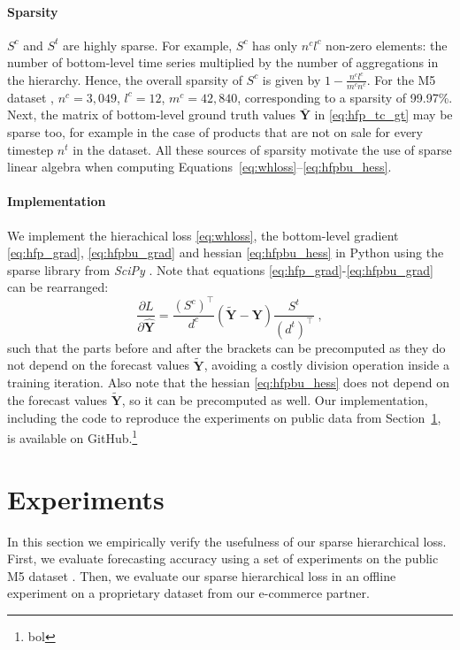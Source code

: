 \documentclass[preprint, 3p, times, twocolumn]{elsarticle}
\begin{document}
\paragraph{Sparsity} \(S^c\) and \(S^t\) are highly sparse. For example, \(S^c\) has only \(n^cl^c\) non-zero elements: the number of bottom-level time series multiplied by the number of aggregations in the hierarchy. Hence, the overall sparsity of \(S^c\) is given by \( 1 - \frac{n^cl^c}{m^cn^c} \). For the M5 dataset \cite{makridakis_m5_2021}, \(n^c = 3,049\), \(l^c = 12\), \(m^c=42,840\), corresponding to a sparsity of 99.97\%. Next, the matrix of bottom-level ground truth values \(\bar{\textbf{Y}}\) in \eqref{eq:hfp_tc_gt} may be sparse too, for example in the case of products that are not on sale for every timestep \(n^t\) in the dataset. All these sources of sparsity motivate the use of sparse linear algebra when computing Equations~\eqref{eq:whloss}--\eqref{eq:hfpbu_hess}. 

\paragraph{Implementation} We implement the hierachical loss \eqref{eq:whloss}, the bottom-level gradient \eqref{eq:hfp_grad}, \eqref{eq:hfpbu_grad} and hessian \eqref{eq:hfpbu_hess} in Python using the sparse library from \textit{SciPy} \cite{virtanen_scipy_2020}. Note that equations \eqref{eq:hfp_grad}-\eqref{eq:hfpbu_grad} can be rearranged:
\begin{equation} 
  \frac{\partial L}{\partial \hat{\textbf{Y}}} = \frac{(S^c)^\intercal}{d^c} \left( \tilde{\textbf{Y}} - \textbf{Y} \right) \frac{S^t}{(d^t)^\intercal} \;,
\end{equation}
such that the parts before and after the brackets can be precomputed as they do not depend on the forecast values \(\tilde{\textbf{Y}}\), avoiding a costly division operation inside a training iteration. Also note that the hessian \eqref{eq:hfpbu_hess} does not depend on the forecast values \(\tilde{\textbf{Y}}\), so it can be precomputed as well. Our implementation, including the code to reproduce the experiments on public data from Section~\ref{sec:experiments}, is available on GitHub.\footnote{bol}

\section{Experiments}
  \label{sec:experiments}
  In this section we empirically verify the usefulness of our sparse hierarchical loss. First, we evaluate forecasting accuracy using a set of experiments on the public M5 dataset \cite{makridakis_m5_2021}. Then, we evaluate our sparse hierarchical loss in an offline experiment on a proprietary dataset from our e-commerce partner.
\end{document}

